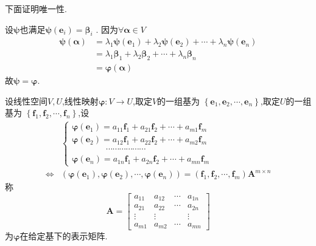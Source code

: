 \begin{green}
\begin{Proof}
下面证明唯一性.

设$\bm{\psi}$也满足$\bm{\psi}\left(\bm{e}_i\right)=\bm{\beta}_i$
.
因为$\forall \bm{\alpha}\in V$
\begin{align*}
\bm{\psi}\left(\bm{\alpha}\right)&=\lambda_1\bm{\psi}\left(\bm{e}_1\right)+\lambda_2\bm{\psi}\left(\bm{e}_2\right)+\cdots+
\lambda_n\bm{\psi}\left(\bm{e}_n\right)\\
&=\lambda_1\bm{\beta}_1+\lambda_2\bm{\beta}_2+\cdots+\lambda_n\bm{\beta}_n\\
&=\bm{\varphi}\left(\bm{\alpha}\right)
\end{align*}
故$\bm{\psi}=\bm{\varphi}.$
\end{Proof}
\end{green}
\begin{formal}
\begin{definition}[表示矩阵]\label{def:表示矩阵}
    设线性空间$V,U$,线性映射$\bm{\varphi}:
    V\longrightarrow U$,取定$V$的一组基为
    $\left\{\bm{e}_1,\bm{e}_2,\cdots,
    \bm{e}_n\right\}$,取定$U$的一组基为
    $\left\{\bm{f}_1,\bm{f}_2,\cdots,
    \bm{f}_n\right\}$,设
    \begin{align*}
    &\begin{cases*}
        \bm{\varphi}\left(\bm{e}_1
        \right) = a_{11}\bm{f}_1+a_{21}\bm{f}_2
        +\cdots+a_{m1}\bm{f}_m\\
        \bm{\varphi}\left(\bm{e}_2
        \right) = a_{12}\bm{f}_1+a_{22}\bm{f}_2
        +\cdots+a_{m2}\bm{f}_m\\
        \qquad\qquad\cdots\cdots\cdots
        \cdots\cdots\cdots\\
        \bm{\varphi}\left(\bm{e}_n
        \right) = a_{1n}\bm{f}_1+a_{2n}\bm{f}_2
        +\cdots+a_{mn}\bm{f}_m
    \end{cases*}\\
    \Longleftrightarrow & 
    \left(\bm{\varphi}\left(\bm{e}_1
    \right),\bm{\varphi}\left(\bm{e}_2\right),\cdots,\bm{\varphi}\left(
        \bm{e}_n
    \right)\right)=
    \left(
        \bm{f}_1,\bm{f}_2,\cdots,\bm{f}_m
    \right)\bm{A}^{m \times n}
\end{align*}
    称
    \[
    \bm{A}=\begin{bmatrix}
        a_{11} & a_{12} & \cdots & a_{1n}\\
        a_{21} & a_{22} & \cdots & a_{2n}\\
        \vdots & \vdots &  & \vdots\\
        a_{m1} & a_{m2} & \cdots & a_{mn}
    \end{bmatrix}
    \]
    为$\bm{\varphi}$在给定基下的表示矩阵.
\end{definition}
\end{formal}
